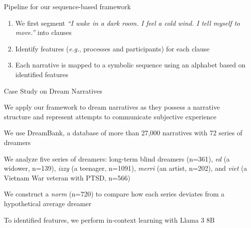 \documentclass[handout,10pt]{beamer}
\begin{document}
\begin{frame}{Pipeline for our sequence-based framework}
\pause

\begin{enumerate}[<+->]
    \item We first segment \textit{“I wake in a dark room. I feel a cold wind. I tell myself to move.”} into clauses
    \item Identify features (\textit{e.g.}, processes and participants) for each clause
    \item Each narrative is mapped to a symbolic sequence using an alphabet based on identified features
\end{enumerate}

    
\end{frame}

\begin{frame}{Case Study on Dream Narratives}

We apply our framework to dream narratives as they possess a narrative structure and represent attempts to communicate subjective experience

\vspace{0.25cm}
\pause

We use DreamBank, a database of more than 27,000 narratives with 72 series of dreamers

\vspace{0.25cm}
\pause

We analyze five series of dreamers: long-term blind dreamers (n=361), \textit{ed} (a widower, n=139), \textit{izzy} (a teenager, n=1091), \textit{merri} (an artist, n=202), and \textit{viet} (a Vietnam War veteran with PTSD, n=566)%

\vspace{0.25cm}
\pause

We construct a \textit{norm} (n=720) to compare how each series deviates from a hypothetical average dreamer %


\vspace{0.25cm}
\pause

To identified features, we perform in-context learning with Llama 3 8B
    
\end{frame}
\end{document}
